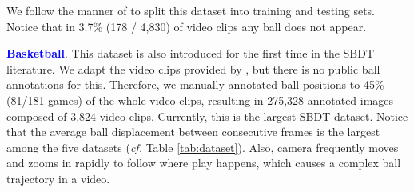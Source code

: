 \documentclass{bmvc2k}
\def\ie{\emph{i.e}\bmvaOneDot}
\begin{document}
We follow the manner of \cite{Ibrahim+cvpr2016} to split this dataset into training and testing sets.
Notice that in 3.7\% (178 / 4,830) of video clips any ball does not appear.
\par
\vspace{1mm}
\noindent \textbf{\textcolor{blue}{Basketball}}.
This dataset is also introduced for the first time in the SBDT literature.
We adapt the video clips provided by \cite{yan+2020eccv}, but there is no public ball annotations for this.
Therefore, we manually annotated ball positions to 45\% (81/181 games) of the whole video clips, resulting in 275,328 annotated images composed of 3,824 video clips.
Currently, this is the largest SBDT dataset.
Notice that the average ball displacement between consecutive frames is the largest among the five datasets
({\it cf.} Table \ref{tab:dataset}).
Also, camera frequently moves and zooms in rapidly to follow where play happens, which causes a complex ball trajectory in a video.
\begin{table}[t]
\centering
{}
\caption{Summary of 5 SBDT datasets used in our evaluation. Among them, \textcolor{blue}{Volleyball} and \textcolor{blue}{Basketball} are newly introduced in this work. Also, for \textcolor{blue}{Soccer} and \textcolor{blue}{Basketball} we provide novel frame-wise manual annotations of 2D ball position. In this table, ``resolution'' represents the majority of image resolution in the dataset and ``disp.'' represents the average ball displacement in pixel between consecutive frames. Notice that frame per second (FPS) of \textcolor{blue}{Volleyball} and \textcolor{blue}{Basketball} are unknown (\ie, N/A), since they are not provided by adapted image sequences.}
\label{tab:dataset}
\end{table}
\end{document}
